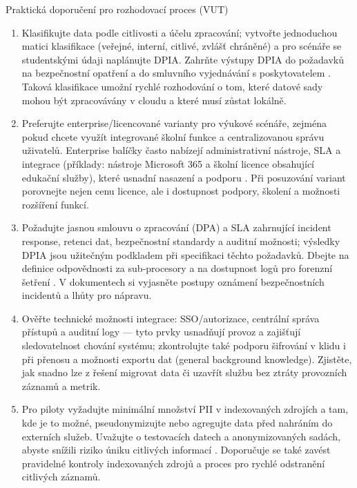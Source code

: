 \documentclass{report}%
\begin{document}
Praktická doporučení pro rozhodovací proces (VUT)
\begin{enumerate}
\item Klasifikujte data podle citlivosti a účelu zpracování; vytvořte jednoduchou matici klasifikace (veřejné, interní, citlivé, zvlášť chráněné) a pro scénáře se studentskými údaji naplánujte DPIA. Zahrňte výstupy DPIA do požadavků na bezpečnostní opatření a do smluvního vyjednávání s poskytovatelem \cite{kb_malinka_chatgpt_ve_vyuce_dva_roky_pote_2024_pdf_90bc3aaf_page_12_1}. Taková klasifikace umožní rychlé rozhodování o tom, které datové sady mohou být zpracovávány v cloudu a které musí zůstat lokálně.
\item Preferujte enterprise/licencované varianty pro výukové scénáře, zejména pokud chcete využít integrované školní funkce a centralizovanou správu uživatelů. Enterprise balíčky často nabízejí administrativní nástroje, SLA a integrace (příklady: nástroje Microsoft 365 a školní licence obsahující edukační služby), které usnadní nasazení a podporu \cite{kb_ai_101_tipu_pdf_04e4a115_page_15_2, kb_ai_101_tipu_pdf_04e4a115_page_36_1}. Při posuzování variant porovnejte nejen cenu licence, ale i dostupnost podpory, školení a možnosti rozšíření funkcí.
\item Požadujte jasnou smlouvu o zpracování (DPA) a SLA zahrnující incident response, retenci dat, bezpečnostní standardy a auditní možnosti; výsledky DPIA jsou užitečným podkladem při specifikaci těchto požadavků. Dbejte na definice odpovědnosti za sub‑procesory a na dostupnost logů pro forenzní šetření \cite{kb_ai_101_tipu_pdf_04e4a115_page_8_1, kb_malinka_chatgpt_ve_vyuce_dva_roky_pote_2024_pdf_90bc3aaf_page_12_1}. V dokumentech si vyjasněte postupy oznámení bezpečnostních incidentů a lhůty pro nápravu.
\item Ověřte technické možnosti integrace: SSO/autorizace, centrální správa přístupů a auditní logy — tyto prvky usnadňují provoz a zajišťují sledovatelnost chování systému; zkontrolujte také podporu šifrování v klidu i při přenosu a možnosti exportu dat (general background knowledge). Zjistěte, jak snadno lze z řešení migrovat data či uzavřít službu bez ztráty provozních záznamů a metrik.
\item Pro piloty vyžadujte minimální množství PII v indexovaných zdrojích a tam, kde je to možné, pseudonymizujte nebo agregujte data před nahráním do externích služeb. Uvažujte o testovacích datech a anonymizovaných sadách, abyste snížili riziko úniku citlivých informací \cite{kb_ai_101_tipu_pdf_04e4a115_page_8_1}. Doporučuje se také zavést pravidelné kontroly indexovaných zdrojů a proces pro rychlé odstranění citlivých záznamů.
\end{enumerate}
\end{document}
